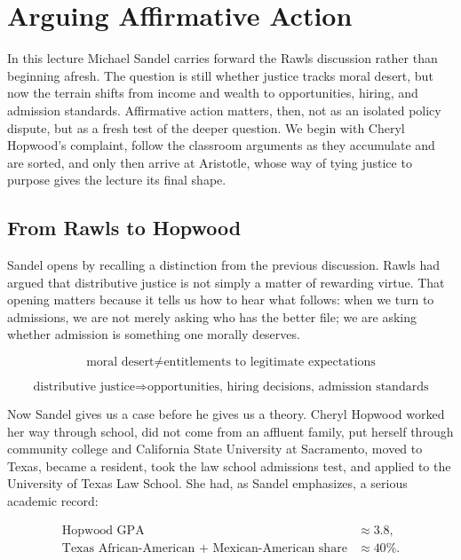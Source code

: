 \chapter{Arguing Affirmative Action}

In this lecture Michael Sandel carries forward the Rawls discussion rather than beginning afresh. The question is still whether justice tracks moral desert, but now the terrain shifts from income and wealth to opportunities, hiring, and admission standards. Affirmative action matters, then, not as an isolated policy dispute, but as a fresh test of the deeper question. We begin with Cheryl Hopwood's complaint, follow the classroom arguments as they accumulate and are sorted, and only then arrive at Aristotle, whose way of tying justice to purpose gives the lecture its final shape.

\section{From Rawls to Hopwood}

Sandel opens by recalling a distinction from the previous discussion. Rawls had argued that distributive justice is not simply a matter of rewarding virtue. That opening matters because it tells us how to hear what follows: when we turn to admissions, we are not merely asking who has the better file; we are asking whether admission is something one morally deserves.

\begin{equation}
\text{moral desert} \neq \text{entitlements to legitimate expectations}
\end{equation}

\begin{equation}
\text{distributive justice}
\Longrightarrow
\text{opportunities, hiring decisions, admission standards}
\end{equation}

Now Sandel gives us a case before he gives us a theory. Cheryl Hopwood worked her way through school, did not come from an affluent family, put herself through community college and California State University at Sacramento, moved to Texas, became a resident, took the law school admissions test, and applied to the University of Texas Law School. She had, as Sandel emphasizes, a serious academic record:

\begin{align}
\text{Hopwood GPA} &\approx 3.8,\\
\text{Texas African-American + Mexican-American share} &\approx 40\%.
\end{align}

